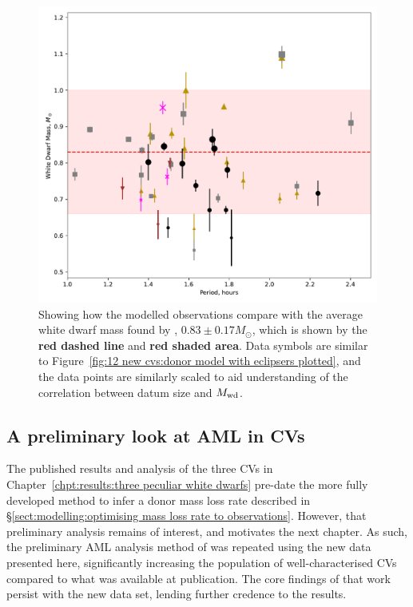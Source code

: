 \begin{figure}
    \centering
    \includegraphics[width=\textwidth]{figures/results/Modelled_Mwd_vs_Period.pdf}
    \caption{Showing how the modelled observations compare with the average white dwarf mass found by \citet{pala2020}, $0.83\pm0.17 M_\odot$, which is shown by the {\bf red dashed line} and {\bf red shaded area}. Data symbols are similar to Figure~\ref{fig:12 new cvs:donor model with eclipsers plotted}, and the data points are similarly scaled to aid understanding of the correlation between datum size and $M_{\rm wd}$.}
    \label{fig:12 new cvs:white dwarf masses vs period}
\end{figure}



\subsection{A preliminary look at AML in CVs}
\label{sect:12 new cvs:period excess}

The published results and analysis of the three CVs in Chapter~\ref{chpt:results:three peculiar white dwarfs} \citep{wild2021} pre-date the more fully developed method to infer a donor mass loss rate described in \S\ref{sect:modelling:optimising mass loss rate to observations}. However, that preliminary analysis remains of interest, and motivates the next chapter.
As such, the preliminary AML analysis method of \citet{wild2021} was repeated using the new data presented here, significantly increasing the population of well-characterised CVs compared to what was available at publication. The core findings of that work persist with the new data set, lending further credence to the results.

